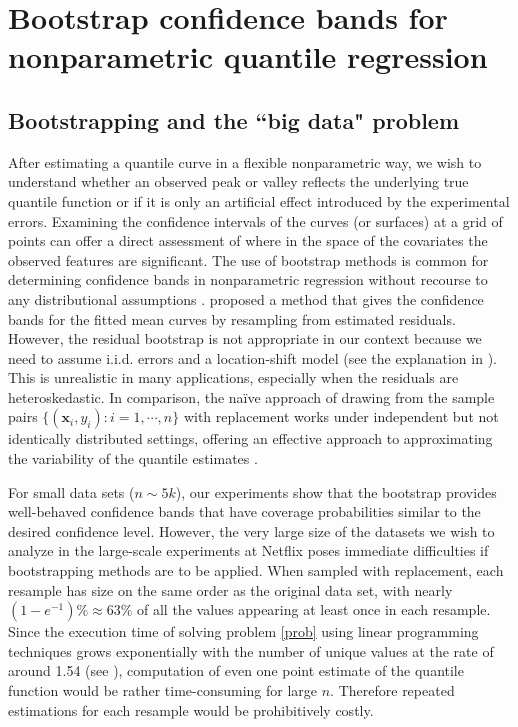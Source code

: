 \documentclass{statsoc}
\begin{document}
\section{Bootstrap confidence bands for nonparametric quantile regression}\label{s3}
\subsection{Bootstrapping and the ``big data" problem}

After estimating a quantile curve in a flexible nonparametric way, we wish to understand whether an observed peak or valley reflects the underlying true quantile function or if it is only an artificial effect introduced by the experimental errors. Examining the confidence intervals of the curves (or surfaces) at a grid of points can offer a direct assessment of where in the space of the covariates the observed features are significant. The use of bootstrap methods is common for determining confidence bands in nonparametric regression without recourse to any distributional assumptions \citep{mcdonald1982interactive,dikta1990bootstrap}. \citet{hardle1991bootstrap} proposed a method that gives the confidence bands for the fitted mean curves by resampling from estimated residuals. However, the residual bootstrap is  {not appropriate in our context} because we need to assume i.i.d. errors and a location-shift model (see the explanation in \citet[p. 105]{koenker2005quantile}). This is unrealistic in many applications, especially when the residuals are heteroskedastic. In comparison, the na\"{i}ve approach of drawing from the sample pairs $\{(\mathbf{x}_i,y_i):i=1,\cdots,n\}$ with replacement works under independent but not identically distributed settings, offering an effective approach to approximating the variability of the quantile estimates \citep{dikta1990bootstrap}.

For small data sets ($n\sim 5k$), our experiments show that the bootstrap provides well-behaved confidence bands that have coverage probabilities similar to the desired confidence level. However, the very large size of the datasets we wish to analyze in the large-scale experiments at Netflix poses immediate difficulties if bootstrapping methods are to be applied. When sampled with replacement, each resample has size on the same order as the original data set, with nearly $(1-e^{-1})\%\approx 63\%$ of all the values appearing at least once in each resample. Since the execution time of solving problem \eqref{prob} using linear programming techniques grows exponentially with the number of unique values at the rate of around 1.54 (see \citet{koenker2005frisch}), computation of even one point estimate of the quantile function would be rather time-consuming for large $n$. Therefore repeated estimations for each resample would be prohibitively costly.
\end{document}
